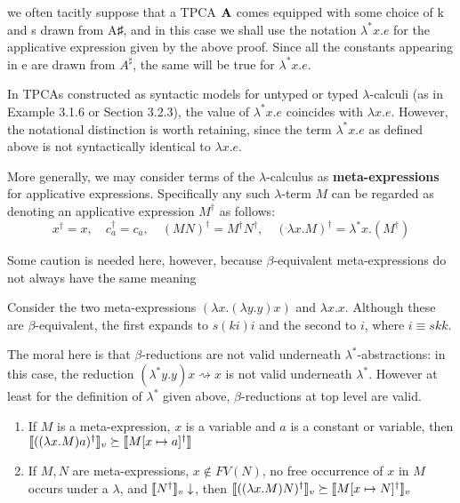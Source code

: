 \documentclass[11pt]{article}
\begin{document}
we often tacitly suppose that a TPCA \(\operatorname{\textbf{A}}\) comes equipped with some choice of k and s drawn from A♯,
and in this case we shall use the notation \(\lambda^*x.e\) for the applicative expression given by the
above proof. Since all the constants appearing in e are drawn from \(A^\sharp\), the same will be true for
\(\lambda^*x.e\).


In TPCAs constructed as syntactic models for untyped or typed \(\lambda\)-calculi (as in Example 3.1.6 or
Section 3.2.3), the value of \(\lambda^*x.e\) coincides with \(\lambda x.e\). However, the notational distinction is worth
retaining, since the term \(\lambda^*x.e\) as defined above is not syntactically identical
to \(\lambda x.e\).

More generally, we may consider terms of the \(\lambda\)-calculus as \textbf{meta-expressions} for applicative
expressions. Specifically any such \(\lambda\)-term \(M\) can be regarded as denoting an applicative
expression \(M^\dagger\) as follows:
\begin{equation*}
x^\dag=x,\quad c_a^\dag=c_a,\quad (MN)^\dag=M^\dag N^\dag,\quad(\lambda x.M)^\dag=\lambda^*x.(M^\dag)
\end{equation*}

Some caution is needed here, however, because \(\beta\)-equivalent meta-expressions
do not always have the same meaning
\begin{examplle}[]
Consider the two meta-expressions \((\lambda x.(\lambda y.y)x)\) and \(\lambda x.x\). Although these are
\(\beta\)-equivalent, the first expands to \(s(ki)i\) and the second to \(i\), where \(i\equiv skk\).
\end{examplle}

The moral here is that \(\beta\)-reductions are not valid underneath \(\lambda^*\)-abstractions: in this case,
the reduction \((\lambda^*y.y)x\rightsquigarrow x\) is not valid underneath \(\lambda^*\). However at
least for the definition of \(\lambda^*\) given above, \(\beta\)-reductions at top level are valid.

\begin{proposition}[]
\label{3.5.5}
\begin{enumerate}
\item If \(M\) is a meta-expression, \(x\) is a variable and \(a\) is a constant or variable,
then \(\llbracket ((\lambda x.M)a)^\dag \rrbracket_v\succeq\llbracket M[x\mapsto a]^\dag \rrbracket\)
\item If \(M,N\) are meta-expressions, \(x\notin FV(N)\), no free occurrence of \(x\) in \(M\) occurs
under a \(\lambda\), and \(\llbracket N^\dag \rrbracket_v\downarrow\), then \(\llbracket ((\lambda x.M)N)^\dag \rrbracket_v\succeq\llbracket M[x\mapsto N]^\dag \rrbracket_v\)
\end{enumerate}
\end{proposition}
\end{document}
